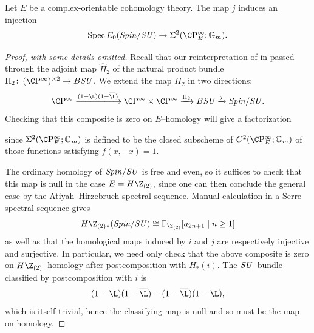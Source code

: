 \begin{lemma}\label{SpinSUComparisonMapIsInj}
Let \(E\) be a complex-orientable cohomology theory.
The map \(j\) induces an injection \[\Spec E_0(\Spin/\SU) \to \Sigma^2(\CP^\infty_E; \Gm).\]
\end{lemma}
\begin{proof}[Proof, with some details omitted]
Recall that our reinterpretation of  in  passed through the adjoint map \(\widehat \Pi_2\) of the natural product bundle \(\Pi_2\co (\CP^\infty)^{\times 2} \to B\SU\).
We extend the map \(\Pi_2\) in two directions: \[\CP^\infty \xrightarrow{(1 - \L)(1 - \overline{\L})} \CP^\infty \times \CP^\infty \xrightarrow{\Pi_2} B\SU \xrightarrow{j} \Spin/\SU.\]
Checking that this composite is zero on \(E\)--homology will give a factorization
\begin{center}
\end{center}
since \(\Sigma^2(\CP^\infty_E; \Gm)\) is defined to be the closed subscheme of \(C^2(\CP^\infty_E; \Gm)\) of those functions satisfying \(f(x, -x) = 1\).

The ordinary homology of \(\mathit{Spin}/\mathit{SU}\) is free and even, so it suffices to check that this map is null in the case \(E = H\Z_{(2)}\), since one can then conclude the general case by the Atiyah--Hirzebruch spectral sequence.
Manual calculation in a Serre spectral sequence gives \[H\Z_{(2)}{}_*(\Spin/\SU) \cong \Gamma_{\Z_{(2)}}[a_{2n+1} \mid n \ge 1]\] as well as that the homological maps induced by \(i\) and \(j\) are respectively injective and surjective.
In particular, we need only check that the above composite is zero on \(H\Z_{(2)}\)--homology after postcomposition with \(H_*(i)\).
The \(\mathit{SU}\)--bundle classified by postcomposition with \(i\) is \[(1 - \L)(1 - \overline \L) - (1 - \overline \L)(1 - \L),\] which is itself trivial, hence the classifying map is null and so must be the map on homology.


\end{proof}
